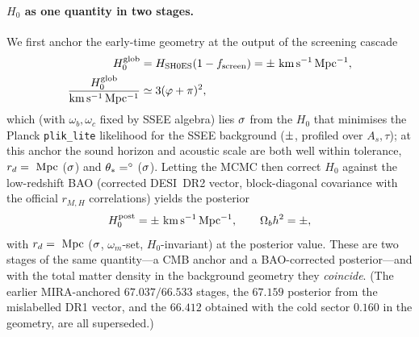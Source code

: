 \documentclass[a4paper,11pt]{article}
\newcommand{\kms}{\mathrm{km\,s^{-1}\,Mpc^{-1}}}
\begin{document}
\paragraph{$H_0$ as one quantity in two stages.} We first anchor the
early-time geometry at the output of the screening cascade
\begin{equation}
  \begin{aligned}
  H_0^{\rm glob} &= H_{\rm SH0ES}(1-f_{\rm screen}) = \val{H0_GLOBAL_d3}\pm\val{p9_hglob_sigma}~\kms ,\\
  \frac{H_0^{\rm glob}}{\kms} &\simeq 3(\varphi+\pi)^2 ,
  \end{aligned}
  \label{eq:h0anchor}
\end{equation}
which (with $\omega_b,\omega_c$ fixed by SSEE algebra) lies $\val{perfil_h0_d}\sigma$ from the $H_0$ that
minimises the Planck \texttt{plik\_lite} likelihood for the SSEE background ($\val{perfil_h0_min}\pm\val{perfil_h0_sig}$, profiled over $A_s,\tau$); at this anchor the
sound horizon and acoustic scale are both well within tolerance,
$r_d = \val{p2_lyaB_rd}~\mathrm{Mpc}$ ($\val{p3_rd_sig_anc}\sigma$) and
$\theta_\ast = \val{p3_th_deg_anc}^\circ$ ($\val{p3_th_sig_anc}\sigma$). Letting the MCMC then correct
$H_0$ against the low-redshift BAO (corrected DESI~DR2 vector, block-diagonal
covariance with the official $r_{M,H}$ correlations) yields the posterior
\begin{equation}
  H_0^{\mathrm{post}} = \val{h0_p2}\pm\val{h0_p2_s}~\kms ,
  \qquad
  \Omega_b h^2 = \val{p2_obh2} \pm \val{p2_obh2_s} ,
  \label{eq:h0post}
\end{equation}
with $r_d = \val{p2_lyaB_rd}~\mathrm{Mpc}$ ($\val{p3_rd_sig_post}\sigma$, $\omega_m$-set, $H_0$-invariant)
at the posterior value. These are two stages of the same quantity---a CMB
anchor and a BAO-corrected posterior---and with the total matter density in the
background geometry they \emph{coincide}. (The earlier MIRA-anchored
$67.037/66.533$ stages, the $67.159$ posterior from the mislabelled DR1 vector,
and the $66.412$ obtained with the cold sector $0.160$ in the geometry, are all
superseded.)
\end{document}
